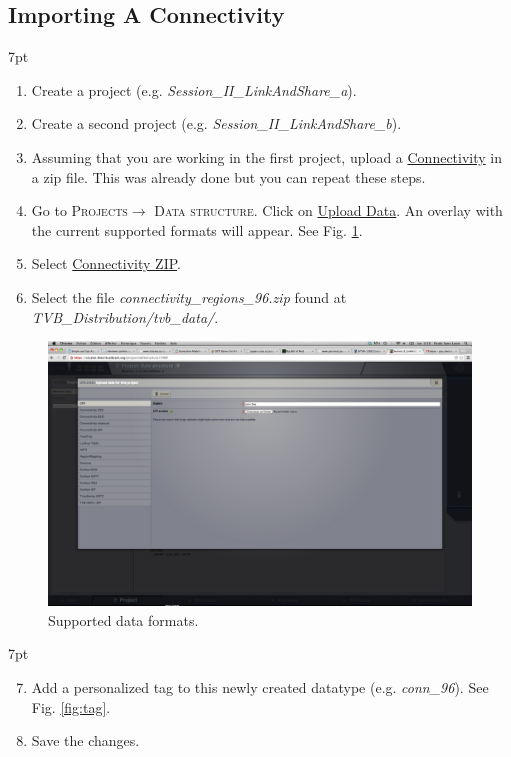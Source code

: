 \documentclass{tufte-handout}
\newenvironment{formal}{%
  \def\FrameCommand{%
    \hspace{1pt}%
    {\color{DarkBlue}\vrule width 2pt}%
    {\color{formalshade}\vrule width 4pt}%
    \colorbox{formalshade}%
  }%
  \MakeFramed{\advance\hsize-\width\FrameRestore}%
  \noindent\hspace{-4.55pt}%
  \begin{adjustwidth}{}{7pt}%
  \vspace{2pt}\vspace{2pt}%
}
{%
  \vspace{2pt}\end{adjustwidth}\endMakeFramed%
}
\begin{document}
\subsection{Importing A Connectivity}\label{sec:import_connectivity}

\begin{formal}
\begin{enumerate}
\item Create a project (e.g. \textit{Session\_II\_LinkAndShare\_a}). 
\item Create a second project (e.g. \textit{Session\_II\_LinkAndShare\_b}). 
\item Assuming that you are working in the first project, upload a \underline{Connectivity} in a zip file. This was already done but you can repeat these steps. 
\item Go to \textsc{Projects}$\rightarrow$ \textsc{Data structure}. Click on \underline{Upload Data}. An overlay with the current supported formats will appear. See Fig. \ref{fig:uploaders}. 
\item Select \underline{Connectivity ZIP}. 
\item Select the file \textit{connectivity\_regions\_96.zip} found at \textit{TVB\_Distribution/tvb\_data/}.
\end{enumerate}
\end{formal} 

\begin{figure}[h]
  \includegraphics[width=\linewidth]{Handout_UI_LinkAndShare_Uploaders}%
  \caption{Supported data formats.}%
  \label{fig:uploaders}%
\end{figure}


\begin{formal}
\begin{enumerate}[resume]
\setcounter{enumi}{6}
\item Add a personalized tag to this newly created datatype (e.g. \textit{conn\_96}).  See Fig. \ref{fig:tag}. 
\item Save the changes.
\end{enumerate}
\end{formal}
\end{document}
